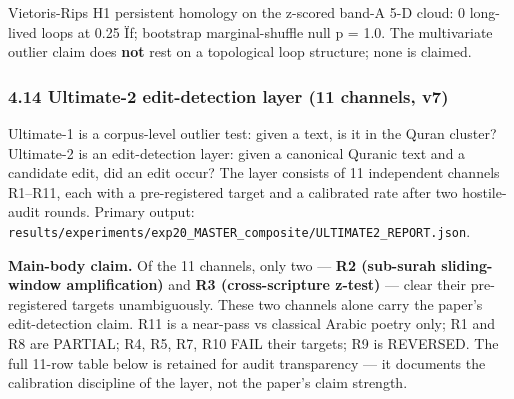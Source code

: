 \documentclass[
]{article}
\newcounter{none} %
\begin{document}
Vietoris-Rips H1 persistent homology on the z-scored band-A 5-D cloud: 0
long-lived loops at 0.25 Ïƒ; bootstrap marginal-shuffle null p = 1.0.
The multivariate outlier claim does \textbf{not} rest on a topological
loop structure; none is claimed.

\subsubsection{4.14 Ultimate-2 edit-detection layer (11 channels,
v7)}\label{ultimate-2-edit-detection-layer-11-channels-v7}

Ultimate-1 is a corpus-level outlier test: given a text, is it in the
Quran cluster? Ultimate-2 is an edit-detection layer: given a canonical
Quranic text and a candidate edit, did an edit occur? The layer consists
of 11 independent channels R1--R11, each with a pre-registered target
and a calibrated rate after two hostile-audit rounds. Primary output:
\texttt{results/experiments/exp20\_MASTER\_composite/ULTIMATE2\_REPORT.json}.

\textbf{Main-body claim.} Of the 11 channels, only two --- \textbf{R2
(sub-surah sliding-window amplification)} and \textbf{R3
(cross-scripture z-test)} --- clear their pre-registered targets
unambiguously. These two channels alone carry the paper's edit-detection
claim. R11 is a near-pass vs classical Arabic poetry only; R1 and R8 are
PARTIAL; R4, R5, R7, R10 FAIL their targets; R9 is REVERSED. The full
11-row table below is retained for audit transparency --- it documents
the calibration discipline of the layer, not the paper's claim strength.
\end{document}

